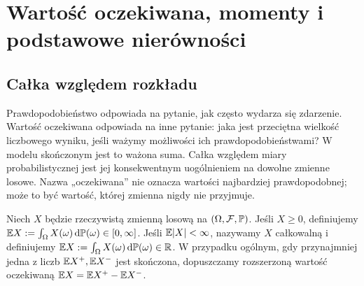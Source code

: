 \chapter{Wartość oczekiwana, momenty i podstawowe nierówności}
\label{ch:expectation}

\section{Całka względem rozkładu}
Prawdopodobieństwo odpowiada na pytanie, jak często wydarza się
zdarzenie. Wartość oczekiwana odpowiada na inne pytanie:
jaka jest przeciętna wielkość liczbowego wyniku, jeśli ważymy
możliwości ich prawdopodobieństwami? W modelu skończonym jest
to ważona suma. Całka względem miary probabilistycznej jest
jej konsekwentnym uogólnieniem na dowolne zmienne losowe.
Nazwa „oczekiwana” nie oznacza wartości najbardziej prawdopodobnej;
może to być wartość, której zmienna nigdy nie przyjmuje.

\begin{definicja}
Niech $X$ będzie rzeczywistą zmienną losową na
$(\Omega,\mathcal F,\mathbb{P})$. Jeśli $X\geq0$, definiujemy
$\mathbb{E} X:=\int_\Omega X(\omega)\,\mathrm{d}\mathbb{P}(\omega)\in[0,\infty]$.
Jeśli $\mathbb{E}|X|<\infty$, nazywamy $X$ całkowalną i definiujemy
$\mathbb{E} X:=\int_\Omega X(\omega)\,\mathrm{d}\mathbb{P}(\omega)\in\mathbb{R}$.
W przypadku ogólnym, gdy przynajmniej jedna z liczb
$\mathbb{E} X^+,\mathbb{E} X^-$ jest skończona, dopuszczamy rozszerzoną
wartość oczekiwaną $\mathbb{E} X=\mathbb{E} X^+-\mathbb{E} X^-$.
\end{definicja}

